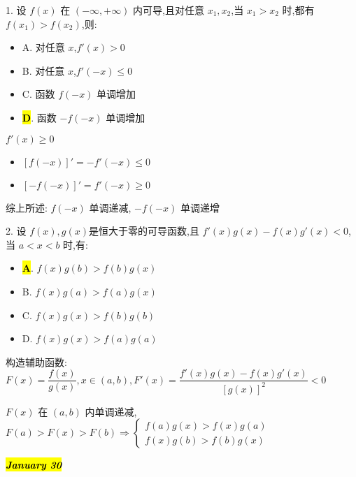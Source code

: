 1. 设 $f(x)$ 在 $(-\infty,+\infty)$ 内可导,且对任意 $x_{1},x_{2}$,当 $x_{1}>x_{2}$ 时,都有 $f(x_{1})>f(x_{2})$,则:
\begin{itemize}
	\item A. 对任意 $x$,$f'(x)>0$
	\item B. 对任意 $x$,$f'(-x)\leq 0$
	\item C. 函数 $f(-x)$ 单调增加
	\item \hl{\textbf{D}}. 函数 $-f(-x)$ 单调增加
\end{itemize}
\begin{solution}

	$f'(x)\geq 0$
	\begin{itemize}
		\item $[f(-x)]' = -f'(-x)\leq 0$
		\item $[-f(-x)]' = f'(-x)\geq 0$
	\end{itemize}

	综上所述: $f(-x)$ 单调递减, $-f(-x)$ 单调递增
\end{solution}

2. 设 $f(x),g(x)$是恒大于零的可导函数,且 $f'(x)g(x)-f(x)g'(x)<0$,当 $a<x<b$ 时,有:
\begin{itemize}
	\item \hl{\textbf{A}}. $f(x)g(b)>f(b)g(x)$
	\item B. $f(x)g(a)>f(a)g(x)$
	\item C. $f(x)g(x)>f(b)g(b)$
	\item D. $f(x)g(x)>f(a)g(a)$
\end{itemize}
\begin{solution}

	构造辅助函数: $F(x) = \dfrac{f(x)}{g(x)}, x\in (a,b), F'(x) = \dfrac{f'(x)g(x)-f(x)g'(x)}{[g(x)]^{2}} < 0$

	$F(x)$ 在 $(a,b)$ 内单调递减, $F(a) > F(x) > F(b)\Rightarrow 
	\begin{cases}
		f(a)g(x) > f(x)g(a)\\
		f(x)g(b) > f(b)g(x)
	\end{cases}$
\end{solution}

\hl{\textbf{\textit{January 30}}}


